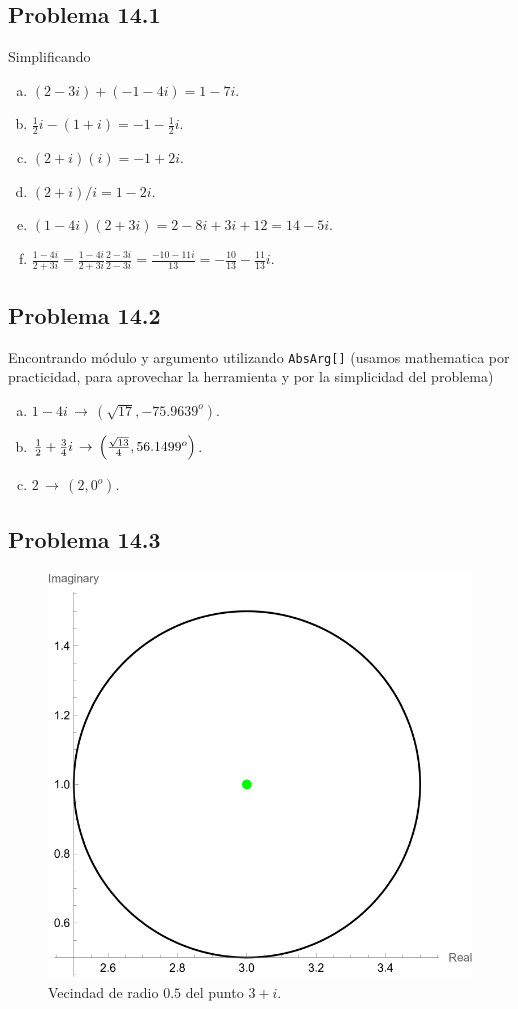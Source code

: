 \documentclass[conference]{IEEEtran}
\begin{document}
\subsection{Problema 14.1}
Simplificando
\begin{enumerate}[a)]
	\item $(2-3i) + (-1-4i) = 1 - 7i$.
	\item $\frac{1}{2} i - (1+i) = -1 - \frac{1}{2} i$.
	\item $(2+i)(i) = -1 + 2i$.
	\item $(2+i)/i = 1 - 2i$.
	\item $(1-4i)(2+3i) = 2 - 8i + 3i + 12 = 14-5i$.
	\item $\frac{1-4i}{2+3i} = \frac{1-4i}{2+3i} \frac{2-3i}{2-3i} = \frac{-10-11i}{13} = -\frac{10}{13} - \frac{11}{13}i$.
\end{enumerate}

\subsection{Problema 14.2}
Encontrando módulo y argumento utilizando \texttt{AbsArg[]} (usamos mathematica por practicidad, para aprovechar la herramienta y por la simplicidad del problema)
\begin{enumerate}[a)]
	\item $1-4i\, \to \, (\sqrt{17},-75.9639^o)$.
	\item $\frac{1}{2} + \frac{3}{4} i \, \to \, \qty(\frac{\sqrt{13}}{4},56.1499^o)$.
	\item $2\, \to \, (2,0^o)$. 
\end{enumerate}

\subsection{Problema 14.3}
\begin{figure}[H]
	\centering
	\includegraphics[scale=0.4]{./img/p14-3_a}
	\caption{Vecindad de radio $0.5$ del punto $3+i$.}
\end{figure}
\end{document}
